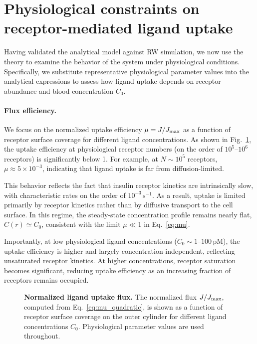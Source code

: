 \section{Physiological constraints on receptor-mediated ligand uptake}\label{sec:physiological}
Having validated the analytical model against RW simulation, we now use the theory to examine the behavior of the system under physiological conditions.
Specifically, we substitute representative physiological parameter values into the analytical expressions to assess how ligand uptake depends on receptor abundance and blood concentration $C_{0}$.

\paragraph{Flux efficiency.}
We focus on the normalized uptake efficiency $\mu = J/J_{\mathrm{max}}$ as a function of receptor surface coverage for different ligand concentrations.
As shown in Fig.~\ref{fig:mu_coverage}, the uptake efficiency at physiological receptor numbers (on the order of $10^{5}$--$10^{6}$ receptors) is significantly below 1.
For example, at $N \sim 10^{5}$ receptors, $\mu \approx 5 \times 10^{-3}$, indicating that ligand uptake is far from diffusion-limited.

This behavior reflects the fact that insulin receptor kinetics are intrinsically slow, with characteristic rates on the order of $10^{-3}\,\mathrm{s}^{-1}$.
As a result, uptake is limited primarily by receptor kinetics rather than by diffusive transport to the cell surface.
In this regime, the steady-state concentration profile remains nearly flat, $C(r) \simeq C_{0}$, consistent with the limit $\mu \ll 1$ in Eq.~\eqref{eq:mu}.

Importantly, at low physiological ligand concentrations ($C_{0} \sim 1$--$100$\,pM), the uptake efficiency is higher and largely concentration-independent, reflecting unsaturated receptor kinetics.
At higher concentrations, receptor saturation becomes significant, reducing uptake efficiency as an increasing fraction of receptors remains occupied.

\begin{figure}[H]
    \centering
    \caption{\textbf{Normalized ligand uptake flux.} The normalized flux $J/J_{\mathrm{max}}$, computed from Eq.~\eqref{eq:mu_quadratic}, is shown as a function of receptor surface coverage on the outer cylinder for different ligand concentrations $C_{0}$. Physiological parameter values are used throughout.}
    \label{fig:mu_coverage}
\end{figure}

